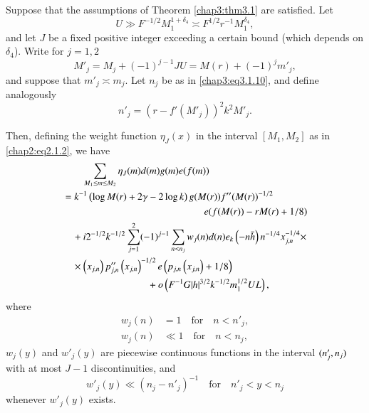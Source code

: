\begin{thm}\label{chap3:thm3.3}
Suppose that the assumptions of Theorem \ref{chap3:thm3.1} are
satisfied. Let 
\begin{equation}\label{chap3:eq3.2.1}
U\gg F^{-1/2}M_1^{1+\delta_4}\asymp F^{1/2}r^{-1}M_1^{\delta_4},
\end{equation}\pageoriginale
and let $J$ be a fixed positive integer exceeding a certain bound
(which depends on $\delta_4$). Write for $j=1,2$
$$
M'_j=M_j+(-1)^{j-1}JU=M(r)+(-1)^jm'_j,
$$
and suppose that $m'_j\asymp m_j$. Let $n_j$ be as in
\eqref{chap3:eq3.1.10}, and define analogously
\begin{equation}\label{chap3:eq3.2.2}
n'_j=\left(r-f'\left(M'_j\right)\right)^2k^2M'_j.
\end{equation}

Then, defining the weight function $\eta_J(x)$ in the interval
$[M_1,M_2]$ as in \eqref{chap2:eq2.1.2}, we have
\begin{align}
&\qquad \sum\limits_{M_1\leq m\leq M_2}\eta_J(m)d(m)g(m)
e(f(m))\label{chap3:eq3.2.3}\\
&= k^{-1}\left(\log M(r)+2\gamma -2\log k\right) g
(M(r))f''(M(r))^{-1/2}\notag\\ 
& \hspace{5cm}e(f(M(r))-rM(r)+1/8)\notag\\
&\quad +i2^{-1/2}k^{-1/2}\sum\limits_{j=1}^2(-1)^{j-1}
\sum\limits_{n<n_j}w_j(n)d(n)e_k\left(-n\bar{h}\right)n^{-1/4}
x_{j,n}^{-1/4}\times\notag\\
&\quad \times \left(x_{j,n}\right)p''_{j,n}\left(x_{j,n}\right)^{-1/2}
e\left(p_{j,n}\left(x_{j,n}\right)+1/8\right)\notag\\
& \hspace{3cm}+o\left(F^{-1}G|h|^{3/2}
k^{-1/2}m_1^{1/2}UL\right),\notag
\end{align}
where
\begin{align}
w_j(n) &=1 \quad\text{for}\quad n < n'_j,\label{chap3:eq3.2.4}\\
w_j(n) &\ll 1\quad\text{for}\quad n < n_j,\label{chap3:eq3.2.5}
\end{align}
$w_j(y)$ and $w'_j(y)$ are piecewise continuous functions in the
interval $(n'_j,\break n_j)$ with at most $J-1$ discontinuities, and 
\begin{equation}\label{chap3:eq3.2.6}
w'_j(y)\ll \left(n_j-n'_j\right)^{-1}\quad\text{for}\quad n'_j<y<n_j 
\end{equation}
whenever $w'_j(y)$ exists.
\end{thm}

